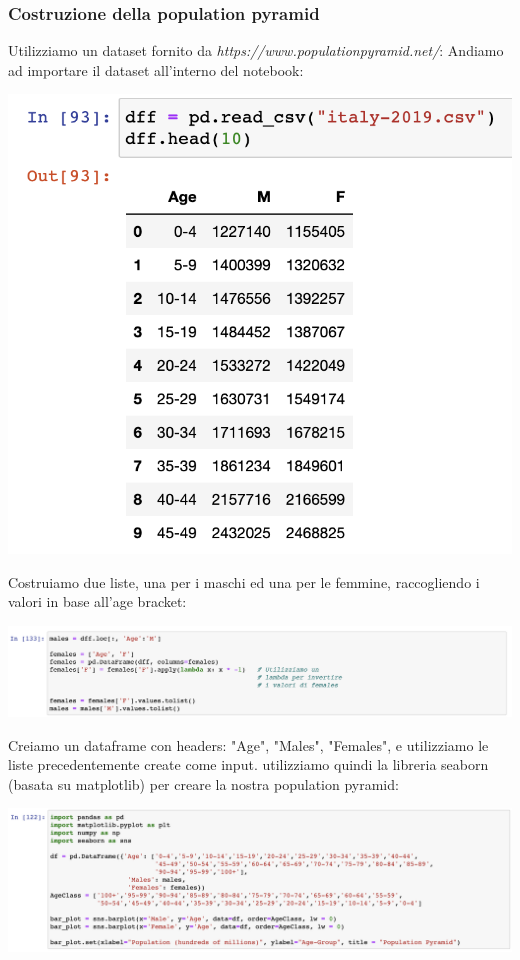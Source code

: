 \documentclass[11pt, oneside]{article}   	%
\begin{document}
\subsubsection{Costruzione della population pyramid}
Utilizziamo un dataset fornito da \emph{https://www.populationpyramid.net/}:
Andiamo ad importare il dataset all'interno del notebook:
\begin{center}
\includegraphics[scale=0.6]{popitaly2}
\end{center}
Costruiamo due liste, una per i maschi ed una per le femmine, raccogliendo i valori in base all'age bracket:
\begin{center}
\includegraphics[scale=0.4]{popitaly3}
\end{center}
Creiamo un dataframe con headers: "Age", "Males", "Females", e utilizziamo le liste precedentemente create come input. utilizziamo quindi la libreria seaborn (basata su matplotlib) per creare la nostra population pyramid:
\begin{center}
\includegraphics[scale=0.4]{popitaly4}
\end{center}
\end{document}
